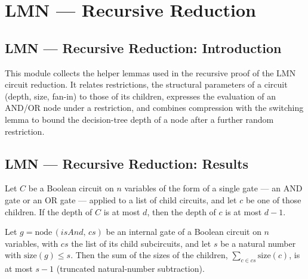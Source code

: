 \section{LMN --- Recursive Reduction}
\subsection*{LMN --- Recursive Reduction: Introduction}

This module collects the helper lemmas used in the recursive proof of the LMN circuit
reduction. It relates restrictions, the structural parameters of a circuit (depth, size,
fan-in) to those of its children, expresses the evaluation of an AND/OR node under a
restriction, and combines compression with the switching lemma to bound the decision-tree
depth of a node after a further random restriction.

\subsection*{LMN --- Recursive Reduction: Results}


\begin{lemma}
\label{LMN.children_depth_le}
\leanok
{}
Let $C$ be a Boolean circuit on $n$ variables of the form of a single gate — an AND gate
or an OR gate — applied to a list of child circuits, and let $c$ be one of those
children. If the depth of $C$ is at most $d$, then the depth of $c$ is at most $d - 1$.
\end{lemma}

\begin{lemma}
\label{LMN.children_size_sum_le}
\leanok
{}
Let $g = \mathrm{node}\,(\mathit{isAnd},\, cs)$ be an internal gate of a Boolean circuit
on $n$ variables, with $cs$ the list of its child subcircuits, and let $s$ be a natural
number with $\mathrm{size}(g) \le s$. Then the sum of the sizes of the children,
$\sum_{c \in cs} \mathrm{size}(c)$, is at most $s - 1$ (truncated natural-number
subtraction).
\end{lemma}


